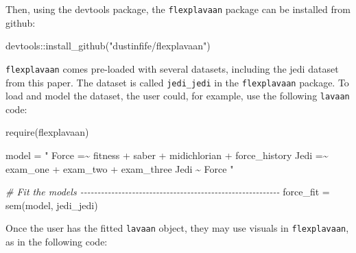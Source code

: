 \documentclass[
  english,
  man]{apa6}
\newenvironment{Shaded}{\begin{snugshade}}{\end{snugshade}}
\newcommand{\CommentTok}[1]{\textcolor[rgb]{0.56,0.35,0.01}{\textit{#1}}}
\newcommand{\FunctionTok}[1]{\textcolor[rgb]{0.00,0.00,0.00}{#1}}
\newcommand{\NormalTok}[1]{#1}
\newcommand{\OtherTok}[1]{\textcolor[rgb]{0.56,0.35,0.01}{#1}}
\newcommand{\SpecialCharTok}[1]{\textcolor[rgb]{0.00,0.00,0.00}{#1}}
\newcommand{\StringTok}[1]{\textcolor[rgb]{0.31,0.60,0.02}{#1}}
\begin{document}
Then, using the devtools package, the \texttt{flexplavaan} package can be installed from github:

\begin{Shaded}
\begin{Highlighting}[]
\NormalTok{devtools}\SpecialCharTok{::}\FunctionTok{install\_github}\NormalTok{(}\StringTok{"dustinfife/flexplavaan"}\NormalTok{)}
\end{Highlighting}
\end{Shaded}

\texttt{flexplavaan} comes pre-loaded with several datasets, including the jedi dataset from this paper. The dataset is called \texttt{jedi\_jedi} in the \texttt{flexplavaan} package. To load and model the dataset, the user could, for example, use the following \texttt{lavaan} code:

\begin{Shaded}
\begin{Highlighting}[]
\FunctionTok{require}\NormalTok{(flexplavaan)}

\NormalTok{model }\OtherTok{=} \StringTok{"}
\StringTok{Force =\textasciitilde{} fitness + saber + midichlorian + force\_history}
\StringTok{Jedi =\textasciitilde{} exam\_one + exam\_two + exam\_three}
\StringTok{Jedi \textasciitilde{} Force}
\StringTok{"}

\CommentTok{\# Fit the models {-}{-}{-}{-}{-}{-}{-}{-}{-}{-}{-}{-}{-}{-}{-}{-}{-}{-}{-}{-}{-}{-}{-}{-}{-}{-}{-}{-}{-}{-}{-}{-}{-}{-}{-}{-}{-}{-}{-}{-}{-}{-}{-}{-}{-}{-}{-}{-}{-}{-}{-}{-}{-}{-}{-}{-}{-}{-}}
\NormalTok{force\_fit }\OtherTok{=} \FunctionTok{sem}\NormalTok{(model, jedi\_jedi)}
\end{Highlighting}
\end{Shaded}

Once the user has the fitted \texttt{lavaan} object, they may use visuals in \texttt{flexplavaan}, as in the following code:
\end{document}
